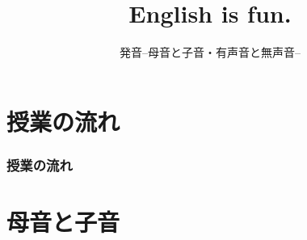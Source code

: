 \documentclass[aspectratio=169,xcolor={dvipsnames,table}]{beamer}
\title{English is fun.}
\subtitle{発音--母音と子音・有声音と無声音--}
\author{}
\institute[]{}
\date[]
\begin{document}
\begin{frame}[label=title]
\thispagestyle{empty}
\titlepage
\end{frame}
%
%
%
%
%
%
%
%
%
\section*{授業の流れ}
\begin{frame}[plain]
  \frametitle{授業の流れ}
  \tableofcontents
\end{frame}
\section{母音と子音}
\end{document}
